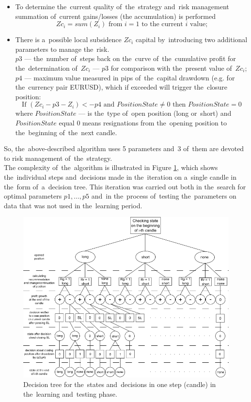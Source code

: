 \documentclass[runningheads,a4paper]{llncs}
\begin{document}
\begin{itemize}
\item To determine the~current quality of~the~strategy and~risk management summation of~current gains/losses (the accumulation) is performed
\begin{equation}
Zc_i = sum ( Z_i ) \text{ from } i = 1 \text{ to the~current } i \text{ value;}
\end{equation}
\item There is a~possible local subsidence $Zc_i$ capital by~introducing two additional parameters to manage the~risk.\\
$p3$ --- the~number of~steps back on the~curve of~the~cumulative profit for the~determination of~$Zc_i$ --- $p3$ for comparison with the~present value of~$Zc_i$;
$p4$ --- maximum value measured in pips of~the~capital drawdown (e.g. for the~currency pair EURUSD), which if exceeded will trigger the~closure position:\\
\begin{equation}
\text{If } ( Zc_i - p3 - Z_i ) <- p4 \text{ and~} PositionState \neq 0 \text{ then } PositionState = 0
\end{equation} 
where $PositionState$ --- is the~type of~open position (long or~short) and $PositionState$ equal 0 means resignations from the~opening position to the~beginning of~the~next candle.
\end{itemize}
So, the~above-described algorithm uses 5 parameters and~3 of~them are devoted to risk management of~the~strategy.\\
The complexity of~the~algorithm is illustrated in Figure \ref{fig:fig7}, which shows the~individual steps and~decisions made in the~iteration on a~single candle in the~form of~a~decision tree. This iteration was carried out both in the~search for optimal parameters $p1, ..., p5$ and~in the~process of~testing the~parameters on data that was not used in the~learning period.
\begin{figure}[h!]
\centering
\includegraphics[width = \textwidth]{figures/rys7.png}
\caption{Decision tree for the~states and~decisions in one step (candle) in the~learning and~testing phase.}
\label{fig:fig7}
\end{figure}
\FloatBarrier
\end{document}
